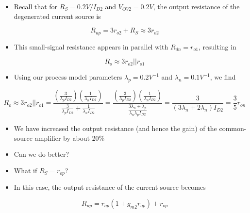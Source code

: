 \documentclass[11pt]{article}
\providecommand{\tightlist}{%
      \setlength{\itemsep}{0pt}\setlength{\parskip}{0pt}}
\begin{document}
    \begin{itemize}
\tightlist
\item
  Recall that for \(R_S = 0.2V/I_{D2}\) and \(V_{OV2} = 0.2V\), the
  output resistance of the degenerated current source is
\end{itemize}

\begin{equation}
R_{up} = 3r_{o2} + R_S \approx 3r_{o2}
\end{equation}

\begin{itemize}
\tightlist
\item
  This small-signal resistance appears in parallel with
  \(R_{dn} = r_{o1}\), resulting in
\end{itemize}

\begin{equation}
R_o \approx 3r_{o2}||r_{o1}
\end{equation}

\begin{itemize}
\tightlist
\item
  Using our process model parameters \(\lambda_p = 0.2V^{-1}\) and
  \(\lambda_n = 0.1V^{-1}\), we find
\end{itemize}

\begin{equation}
R_o \approx 3r_{o2}||r_{o1} = \dfrac{(\frac{3}{\lambda_p I_{D2}})(\frac{1}{\lambda_n I_{D2}})}{\frac{3}{\lambda_p I_{D2}} + \frac{1}{\lambda_n I_{D2}}} = \dfrac{(\frac{3}{\lambda_p I_{D2}})(\frac{1}{\lambda_n I_{D2}})}{\frac{3\lambda_n + \lambda_p}{\lambda_n \lambda_p I_{D2}}} = \dfrac{3}{(3\lambda_n + 2\lambda_n)I_{D2}} = \dfrac{3}{5}r_{on}
\end{equation}

\begin{itemize}
\tightlist
\item
  We have increased the output resistance (and hence the gain) of the
  common-source amplifier by about 20\%
\item
  Can we do better?
\end{itemize}

    \begin{itemize}
\tightlist
\item
  What if \(R_S = r_{op}\)?
\item
  In this case, the output resistance of the current source becomes
\end{itemize}

\begin{equation}
R_{up} = r_{op}(1+g_{m2} r_{op}) + r_{op}
\end{equation}
\end{document}

